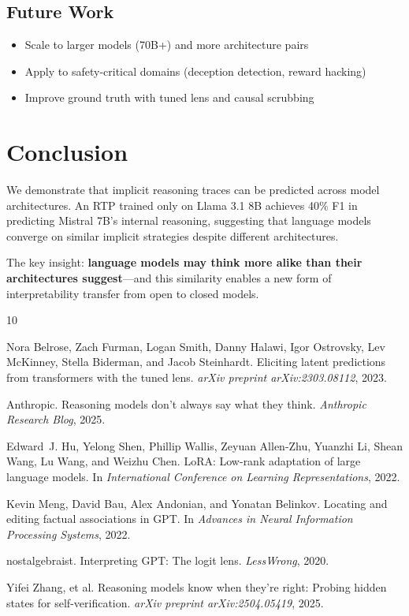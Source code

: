 \documentclass{article}
\begin{document}
\subsection{Future Work}

\begin{itemize}
    \item Scale to larger models (70B+) and more architecture pairs
    \item Apply to safety-critical domains (deception detection, reward hacking)
    \item Improve ground truth with tuned lens and causal scrubbing
\end{itemize}

\section{Conclusion}

We demonstrate that implicit reasoning traces can be predicted across model architectures. An RTP trained only on Llama 3.1 8B achieves 40\% F1 in predicting Mistral 7B's internal reasoning, suggesting that language models converge on similar implicit strategies despite different architectures.

The key insight: \textbf{language models may think more alike than their architectures suggest}---and this similarity enables a new form of interpretability transfer from open to closed models.


\begin{thebibliography}{10}

Nora Belrose, Zach Furman, Logan Smith, Danny Halawi, Igor Ostrovsky, Lev McKinney, Stella Biderman, and Jacob Steinhardt.
\newblock Eliciting latent predictions from transformers with the tuned lens.
\newblock \emph{arXiv preprint arXiv:2303.08112}, 2023.

Anthropic.
\newblock Reasoning models don't always say what they think.
\newblock \emph{Anthropic Research Blog}, 2025.

Edward~J. Hu, Yelong Shen, Phillip Wallis, Zeyuan Allen-Zhu, Yuanzhi Li, Shean Wang, Lu Wang, and Weizhu Chen.
\newblock LoRA: Low-rank adaptation of large language models.
\newblock In \emph{International Conference on Learning Representations}, 2022.

Kevin Meng, David Bau, Alex Andonian, and Yonatan Belinkov.
\newblock Locating and editing factual associations in GPT.
\newblock In \emph{Advances in Neural Information Processing Systems}, 2022.

nostalgebraist.
\newblock Interpreting GPT: The logit lens.
\newblock \emph{LessWrong}, 2020.

Yifei Zhang, et al.
\newblock Reasoning models know when they're right: Probing hidden states for self-verification.
\newblock \emph{arXiv preprint arXiv:2504.05419}, 2025.

\end{thebibliography}
\end{document}
